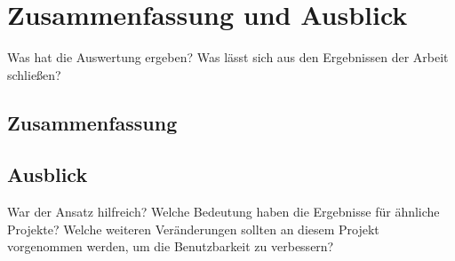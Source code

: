 \chapter{Zusammenfassung und Ausblick} %
Was hat die Auswertung ergeben? Was lässt sich aus den Ergebnissen der Arbeit schließen?

\section{Zusammenfassung} %


\section{Ausblick} %
War der Ansatz hilfreich? Welche Bedeutung haben die Ergebnisse für ähnliche Projekte? Welche weiteren Veränderungen sollten an diesem Projekt vorgenommen werden, um die Benutzbarkeit zu verbessern?